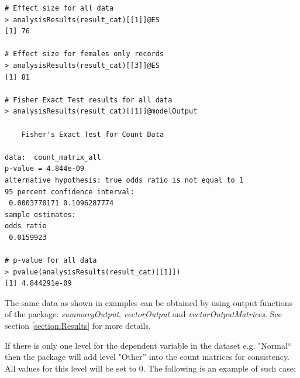 \documentclass[12pt,a4paper]{article}
\begin{document}
\begin{verbatim}
# Effect size for all data
> analysisResults(result_cat)[[1]]@ES
[1] 76

# Effect size for females only records
> analysisResults(result_cat)[[3]]@ES
[1] 81

# Fisher Exact Test results for all data
> analysisResults(result_cat)[[1]]@modelOutput

	Fisher's Exact Test for Count Data

data:  count_matrix_all 
p-value = 4.844e-09
alternative hypothesis: true odds ratio is not equal to 1 
95 percent confidence interval:
 0.0003770171 0.1096287774 
sample estimates:
odds ratio 
 0.0159923
 
# p-value for all data
> pvalue(analysisResults(result_cat)[[1]])
[1] 4.844291e-09
\end{verbatim}
\endgroup

The same data as shown in examples can be obtained by using output functions of the package: \textit{summaryOutput}, \textit{vectorOutput} and \textit{vectorOutputMatrices}. See section \ref{section:Results} for more details.

If there is only one level for the dependent variable in the dataset e.g. "Normal`` then the package will add level "Other'' into the count matrices for consistency. All values for this level will be set to 0.
The following is an example of such case:
\end{document}
